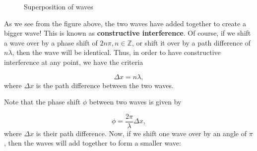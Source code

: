 \documentclass{paper}
\begin{document}
\begin{figure}[H]
\label{fig:adding-two-sine-waves}
\caption{Superposition of waves}


\end{figure}

As we see from the figure above, the two waves have added together to create a bigger wave! This is known as  \textbf{constructive interference}. Of course, if we shift a wave over by a phase shift of $2n\pi, n\in\mathbb{Z}$, or shift it over by a path difference of $n\lambda$, then the wave will be identical. Thus, in order to have constructive interference at any point, we have the criteria

\begin{equation*}
    \Delta x = n\lambda,
\end{equation*}
where $\Delta x$ is the path difference between the two waves.

Note that the phase shift $\phi$ between two waves is given by

\begin{equation}
    \label{eq:path-difference-to-phase-shift}
    \phi = \frac{2\pi}{\lambda}\Delta{x},
\end{equation}
where $\Delta{x}$ is their path difference.
Now, if we shift one wave over by an angle of $\pi$, then the waves will add together to form a smaller wave:

\begin{figure}[H]


\end{figure}
\end{document}
